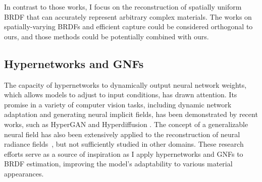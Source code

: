 In contrast to those works, I focus on the reconstruction of spatially uniform BRDF that can accurately represent arbitrary complex materials. The works on spatially-varying BRDFs and efficient capture could be considered orthogonal to ours, and those methods could be potentially combined with ours. 


\subsection{Hypernetworks and GNFs}
The capacity of hypernetworks to dynamically output neural network weights, which allows models to adjust to input conditions, has drawn attention. Its promise in a variety of computer vision tasks, including dynamic network adaptation and generating neural implicit fields, has been demonstrated by recent works, such as HyperGAN \cite{ratzlaff2019hypergan} and Hyperdiffusion \cite{erkocc2023hyperdiffusion}.
The concept of a generalizable neural field has also been extensively applied to the reconstruction of neural radiance fields~\cite{wang2022attention, yang2023contranerf}, but not sufficiently studied in other domains.
These research efforts serve as a source of inspiration as I apply hypernetworks and GNFs to BRDF estimation, improving the model's adaptability to various material appearances.

